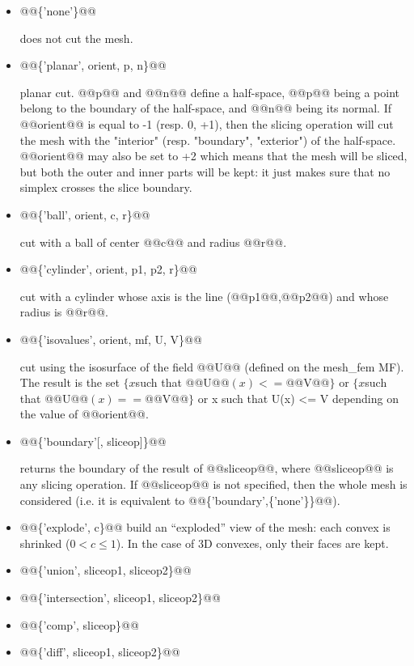 \begin{cmddescription}
  \begin{itemize}
  \item @@\{'none'\}@@
    
    does not cut the mesh.
    
  \item @@\{'planar', \tint orient, \tvec p, \tvec n\}@@
    
    planar cut. @@p@@ and @@n@@ define a half-space, @@p@@ being a
    point belong to the boundary of the half-space, and @@n@@ being
    its normal. If @@orient@@ is equal to -1 (resp. 0, +1), then the
    slicing operation will cut the mesh with the "interior" (resp.
    "boundary", "exterior") of the half-space. @@orient@@ may also be
    set to +2 which means that the mesh will be sliced, but both the
    outer and inner parts will be kept: it just makes sure that no
    simplex crosses the slice boundary.
    
  \item @@\{'ball', \tint orient, \tvec c, \tvec r\}@@
  
    cut with a ball of center @@c@@ and radius @@r@@.
    
  \item @@\{'cylinder', \tint orient, \tvec p1, \tvec p2, \tvec r\}@@
    
    cut with a cylinder whose axis is the line (@@p1@@,@@p2@@) and whose
    radius is @@r@@.
    
  \item @@\{'isovalues', \tint orient, \tmf mf, \tvec U, \tscal V\}@@
    
    cut using the isosurface of the field @@U@@ (defined on the mesh_fem
    MF). The result is the set $\{x $such that @@U@@$(x) <= $@@V@@$\}$ or $\{x $such that
      @@U@@$(x) == $@@V@@$\}$ or {x such that U(x) <= V} depending on the value of
    @@orient@@.
    
  \item @@\{'boundary'[, sliceop]\}@@
  
    returns the boundary of the result of @@sliceop@@, where @@sliceop@@ is any
    slicing operation. If @@sliceop@@ is not specified, then the whole mesh is considered (i.e. it is equivalent to @@\{'boundary',\{'none'\}\}@@).
    
  \item @@\{'explode', c\}@@ build an ``exploded'' view of the mesh:
    each convex is shrinked ($0 < c \leq 1$). In the case of 3D convexes,
    only their faces are kept.

  \item @@\{'union', sliceop1, sliceop2\}@@
  \item @@\{'intersection', sliceop1, sliceop2\}@@
  \item @@\{'comp', sliceop\}@@
  \item @@\{'diff', sliceop1, sliceop2\}@@
    

\end{itemize}
\end{cmddescription}
